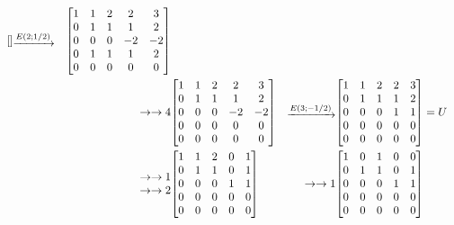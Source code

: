 \documentclass{homework}
\makeatletter
\newenvironment{redmatrix}
  {\left[\array{@{}ccccc@{}}}
  {\endarray\right]}
\newenvironment{ropmatrix}
  {\array{@{}c@{}}}
  {\endarray}
\def\opmult#1#2{\xrightarrow{E(#1;#2)}}
\def\opadd#1#2\to#3{\xrightarrow{E(#2,#3;#1)}}
\makeatother
\begin{document}
{\begin{alignat*}{5}
\begin{redmatrix}
    \end{redmatrix}
     &
    \begin{ropmatrix}
        \opmult{2}{1/2}
    \end{ropmatrix}
     &
    \begin{redmatrix}
        1&1&2&2&3\\
        0&1&1&1&2\\
        0&0&0&-2&-2\\
        0&1&1&1&2\\
        0&0&0&0&0\\
    \end{redmatrix}      \\
     &   &
    \begin{ropmatrix}
        \opadd{-1}{2}\to{4}
    \end{ropmatrix}
     &
    \begin{redmatrix}
        1&1&2&2&3\\
        0&1&1&1&2\\
        0&0&0&-2&-2\\
        0&0&0&0&0\\
        0&0&0&0&0\\
    \end{redmatrix}
     &
    \begin{ropmatrix}
        \opmult{3}{-1/2}
    \end{ropmatrix}
     &
    \begin{redmatrix}
        1&1&2&2&3\\
        0&1&1&1&2\\
        0&0&0&1&1\\
        0&0&0&0&0\\
        0&0&0&0&0\\
    \end{redmatrix} = U \\
     &   &
    \begin{ropmatrix}
        \opadd{-2}{3}\to{1} \\
        \opadd{-1}{3}\to{2}
    \end{ropmatrix}
     &
    \begin{redmatrix}
        1&1&2&0&1\\
        0&1&1&0&1\\
        0&0&0&1&1\\
        0&0&0&0&0\\
        0&0&0&0&0\\
    \end{redmatrix}
     &
    \begin{ropmatrix}
        \opadd{-1}{2}\to{1}
    \end{ropmatrix}
     &
    \begin{redmatrix}
        1&0&1&0&0\\
        0&1&1&0&1\\
        0&0&0&1&1\\
        0&0&0&0&0\\
        0&0&0&0&0\\
    \end{redmatrix}
\end{alignat*}

}
\end{document}
